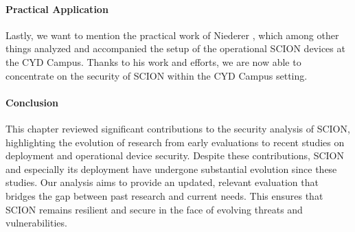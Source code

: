 \paragraph{Practical Application}
Lastly, we want to mention the practical work of Niederer \cite{Niederer2022}, which among other things analyzed and accompanied the setup of the operational SCION devices at the CYD Campus.
Thanks to his work and efforts, we are now able to concentrate on the security of SCION within the CYD Campus setting.

\paragraph{Conclusion}
This chapter reviewed significant contributions to the security analysis of SCION, highlighting the evolution of research from early evaluations to recent studies on deployment and operational device security.
Despite these contributions, SCION and especially its deployment have undergone substantial evolution since these studies.
Our analysis aims to provide an updated, relevant evaluation that bridges the gap between past research and current needs.
This ensures that SCION remains resilient and secure in the face of evolving threats and vulnerabilities.
